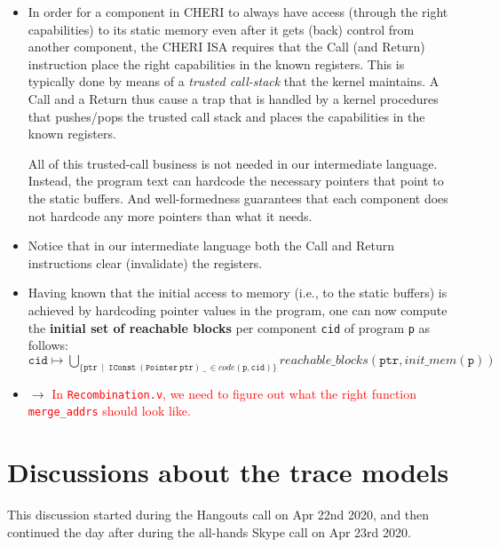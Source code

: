 \documentclass[12pt,a4paper]{article}
\newcommand{\todo}[1]{$\rightarrow$ \textcolor{red}{#1}}
\begin{document}
\begin{itemize}
\item In order for a component in CHERI to always have access
(through the right capabilities) to its
static memory even after it gets (back) control from another 
component, the CHERI ISA 
requires that the Call (and Return) instruction
place the right capabilities in the known registers.
This is typically done by means of a \textit{trusted call-stack}
that the kernel maintains. A Call and a Return thus cause a trap
that is handled by a kernel procedures that pushes/pops the
trusted call stack and places the capabilities in the known
registers.

All of this trusted-call business is not needed in our intermediate
language. Instead, the program text can hardcode the necessary
pointers that point to the static buffers.
And well-formedness guarantees that each component does not
hardcode any more pointers than what it needs.

\item Notice that in our intermediate language
both the Call and Return instructions
clear (invalidate) the registers.

\item Having known that the initial access to memory (i.e., to
the static buffers) is achieved by hardcoding pointer
values in the program, one can now compute the \textbf{initial
set of reachable blocks} per component \texttt{cid}
of program \texttt{p} as follows:\\
$\mathtt{cid} \mapsto \underset{\{\mathtt{ptr}
	 ~\mid~ \mathtt{IConst ~(Pointer ~ptr)~ \_}~ \in
	 \mathit{code}(\texttt{p}, \texttt{cid}) \}}{\bigcup} 
 \mathit{reachable\_blocks}
 (\texttt{ptr}, \mathit{init\_mem}(\texttt{p}))
$

\item \todo{In \texttt{Recombination.v}, we need to figure out
what the right function \texttt{merge\_addrs} should look like.}


\end{itemize}

\section{Discussions about the trace models}

This discussion started during the Hangouts call on Apr 22nd 2020,
and then continued the day after during the all-hands Skype call
on Apr 23rd 2020.
\end{document}
